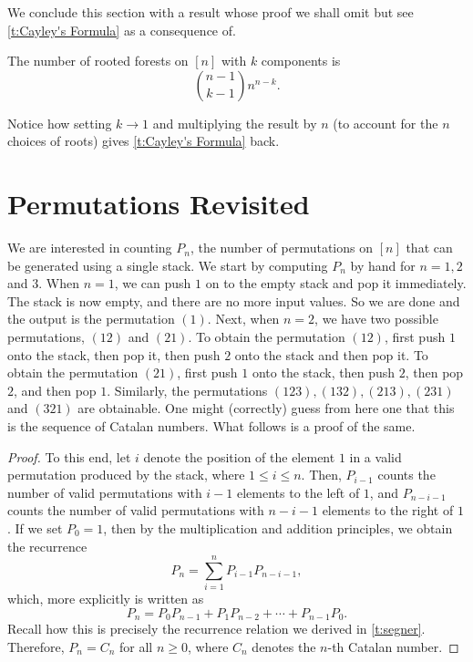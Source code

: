 We conclude this section with a result whose proof we shall omit but see \cref{t:Cayley's Formula} as a consequence of. 
\begin{theorem}
    The number of rooted forests on $[n]$ with $k$ components is \[
    \binom{n-1}{k-1}n^{n-k}.
    \]
\end{theorem}
Notice how setting $k\to 1$ and multiplying the result by $n$ (to account for the $n$ choices of roots) gives \cref{t:Cayley's Formula} back. 
\section{Permutations Revisited}
We are interested in counting \( P_n \), the number of permutations on \([n]\) that can be generated using a single stack. We start by computing $P_n$ by hand for $n=1,2$ and $3$. When $n=1$, we can push $1$ on to the empty stack and pop it immediately. The stack is now empty, and there are no more input values. So we are done and the output is the permutation $(1)$. Next, when $n=2$, we have two possible permutations, $(12)$ and $(21)$. To obtain the permutation $(12)$, first push $1$ onto the stack, then pop it, then push $2$ onto the stack and then pop it. To obtain the permutation $(21)$, first push $1$ onto the stack, then push $2$, then pop $2$, and then pop $1$. Similarly, the permutations $(123),(132),(213),(231)$ and $(321)$ are obtainable. One might (correctly) guess from here one that this is the sequence of Catalan numbers. What follows is a proof of the same.
\begin{proof}
To this end, let \( i \) denote the position of the element \( 1 \) in a valid permutation produced by the stack, where \( 1 \leq i \leq n \). Then, \( P_{i-1} \) counts the number of valid permutations with \( i-1 \) elements to the left of \( 1 \), and \( P_{n-i-1} \) counts the number of valid permutations with \( n-i-1 \) elements to the right of \( 1 \). If we set \( P_0 = 1 \), then by the multiplication and addition principles, we obtain the recurrence
\[
P_n = \sum_{i=1}^n P_{i-1} P_{n-i-1},
\]
which, more explicitly is written as 
\[
P_n = P_0 P_{n-1} + P_1 P_{n-2} + \cdots + P_{n-1} P_0.
\]
Recall how this is precisely the recurrence relation we derived in \cref{t:segner}. Therefore, \( P_n = C_n \) for all \( n \geq 0 \), where \( C_n \) denotes the \( n \)-th Catalan number.
\end{proof}
\endinput
